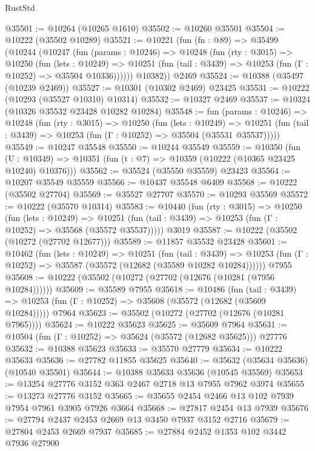 \begin{lexlean}{RustStd}
\begin{coremodule}
@35501 := @10264 (@10265 @1610)
@35502 := @10260 @35501
@35504 := @10222 (@35502 @10289)
@35521 := @10221
    (fun (fn : @89) =>
    @35499
      (@10244
        (@10247
          (fun (params : @10246) =>
          @10248
            (fun (rty : @3015) =>
            @10250
              (fun (lets : @10249) =>
              @10251 (fun (tail : @3439) => @10253 (fun (Γ : @10252) => @35504 @10336))))))
        @10382))
    @2469
@35524 := @10388 (@35497 (@10239 @2469))
@35527 := @10301 (@10302 @2469) @23425
@35531 := @10222 (@10293 (@35527 @10310) @10314)
@35532 := @10327 @2469
@35537 := @10324 (@10326 @35532 @23428 @10282 @10284)
@35548 := fun (params : @10246) =>
  @10248
    (fun (rty : @3015) =>
    @10250
      (fun (lets : @10249) =>
      @10251 (fun (tail : @3439) => @10253 (fun (Γ : @10252) => @35504 (@35531 @35537)))))
@35549 := @10247 @35548
@35550 := @10244 @35549
@35559 := @10350
    (fun (U : @10349) => @10351 (fun (t : @7) => @10359 (@10222 (@10365 @23425 @10240) @10376)))
@35562 := @35524 (@35550 @35559) @23423
@35564 := @10207 @35549 @35559
@35566 := @10437 @35548 @6409
@35568 := @10222 (@35502 @27704)
@35569 := @35527 @27707
@35570 := @10293 @35569
@35572 := @10222 (@35570 @10314)
@35583 := @10440
    (fun (rty : @3015) =>
    @10250
      (fun (lets : @10249) =>
      @10251 (fun (tail : @3439) => @10253 (fun (Γ : @10252) => @35568 (@35572 @35537)))))
    @3019
@35587 := @10222 (@35502 (@10272 (@27702 @12677)))
@35589 := @11857 @35532 @23428
@35601 := @10462
    (fun (lets : @10249) =>
    @10251
      (fun (tail : @3439) =>
      @10253 (fun (Γ : @10252) => @35587 (@35572 (@12682 (@35589 @10282 @10284))))))
    @7955
@35608 := @10222 (@35502 (@10272 (@27702 (@12676 (@10281 (@7956 @10284))))))
@35609 := @35589 @7955
@35618 := @10486
    (fun (tail : @3439) => @10253 (fun (Γ : @10252) => @35608 (@35572 (@12682 (@35609 @10284)))))
    @7964
@35623 := @35502 (@10272 (@27702 (@12676 (@10281 @7965))))
@35624 := @10222 @35623
@35625 := @35609 @7964
@35631 := @10504 (fun (Γ : @10252) => @35624 (@35572 (@12682 @35625))) @27776
@35632 := @10388 @35623
@35633 := @35570 @27779
@35634 := @10222 @35633
@35636 := @27782 @11855 @35625
@35640 := @35632 (@35634 @35636) (@10540 @35501)
@35644 := @10388 @35633 @35636 (@10545 @35569)
@35653 := @13254 @27776 @3152 @363 @2467 @2718 @13 @7955 @7962 @3974
@35655 := @13273 @27776 @3152
@35665 := @35655 @2454 @2466 @13 @102 @7939 @7954 @7961 @3905 @7926 @3664
@35668 := @27817 @2454 @13 @7939
@35676 := @27794 @2437 @2453 @2669 @13 @3450 @7937 @3152 @2716
@35679 := @27804 @2453 @2669 @7937
@35685 := @27884 @2452 @1353 @102 @3442 @7936 @27900

\end{coremodule}
\end{lexlean}
